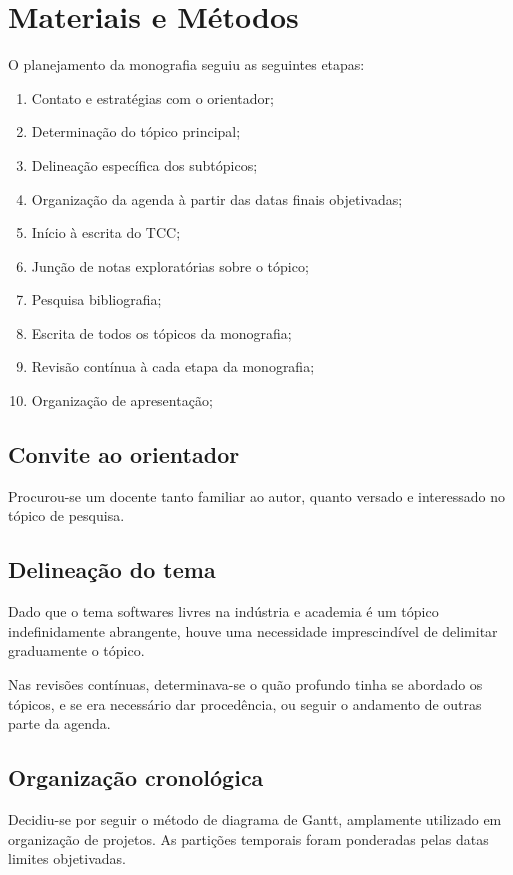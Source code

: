 \documentclass[
12pt,				%
openright,			%
oneside,			%
a4paper,			%
english,			%
french,				%
spanish,			%
brazil,				%
]{abntex2}
\begin{document}
\clearpage



\chapter{Materiais e Métodos}
O planejamento da monografia seguiu as seguintes etapas:

\begin{enumerate}
\item Contato e estratégias com o orientador;
\item Determinação do tópico principal; 
\item Delineação específica dos subtópicos;
\item Organização da agenda à partir das datas finais objetivadas;
\item Início à escrita do TCC;
\item Junção de notas exploratórias sobre o tópico;
\item Pesquisa bibliografia;
\item Escrita de todos os tópicos da monografia;
\item Revisão contínua à cada etapa da monografia;
\item Organização de apresentação;
\end{enumerate}

\section{Convite ao orientador}
Procurou-se um docente tanto familiar ao autor, quanto versado e
interessado no tópico de pesquisa.

\section{Delineação do tema}
Dado que o tema softwares livres na indústria e academia é um tópico
indefinidamente abrangente, houve uma necessidade imprescindível de
delimitar graduamente o tópico.

Nas revisões contínuas, determinava-se o quão profundo tinha se
abordado os tópicos, e se era necessário dar procedência, ou seguir o
andamento de outras parte da agenda.

\section{Organização cronológica}
Decidiu-se por seguir o método de diagrama de Gantt, amplamente
utilizado em organização de projetos. As partições temporais foram
ponderadas pelas datas limites objetivadas.
\end{document}
